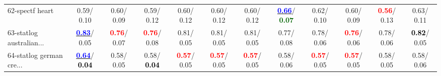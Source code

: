 \begin{table}[h]
\begin{center}
{\begin{tabular}{lc|c|c|c|c|c|c|c|c|c|c}
62-spectf heart &   0.59/  0.10 &   0.60/  0.09 &   0.59/  0.12 &   0.60/  0.12 &   0.60/  0.12 &   0.60/  0.12 & \underline{\textcolor{blue}{\textbf{  0.66}}}/\textcolor{darkgreen}{\textbf{  0.07}} &   0.62/  0.10 &   0.60/  0.09 & \textcolor{red}{\textbf{  0.56}}/  0.13 &   0.63/  0.11 \\
63-statlog australian... & \underline{\textcolor{blue}{\textbf{  0.83}}}/  0.05 & \textcolor{red}{\textbf{  0.76}}/  0.07 & \textcolor{red}{\textbf{  0.76}}/  0.08 &   0.81/  0.05 &   0.81/  0.05 &   0.81/  0.05 &   0.77/  0.08 &   0.78/  0.06 & \textcolor{red}{\textbf{  0.76}}/  0.06 &   0.78/  0.06 & \textcolor{black}{\textbf{  0.82}}/  0.05 \\
64-statlog german cre... & \underline{\textcolor{blue}{\textbf{  0.64}}}/\textcolor{black}{\textbf{  0.04}} &   0.58/  0.05 &   0.58/\textcolor{black}{\textbf{  0.04}} & \textcolor{red}{\textbf{  0.57}}/  0.05 & \textcolor{red}{\textbf{  0.57}}/  0.05 & \textcolor{red}{\textbf{  0.57}}/  0.05 &   0.58/  0.06 & \textcolor{red}{\textbf{  0.57}}/  0.05 & \textcolor{red}{\textbf{  0.57}}/  0.05 &   0.58/  0.05 &   0.58/  0.06 \\\end{tabular}}\label{stratsBalAcc1aIELM}
\end{center}
\end{table}
